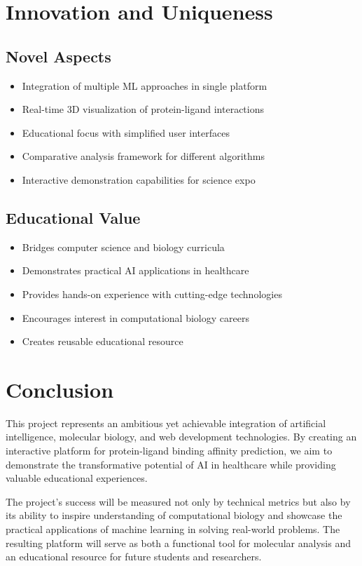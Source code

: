 \documentclass[12pt,a4paper]{article}
\begin{document}
\section{Innovation and Uniqueness}

\subsection{Novel Aspects}
\begin{itemize}
    \item Integration of multiple ML approaches in single platform
    \item Real-time 3D visualization of protein-ligand interactions
    \item Educational focus with simplified user interfaces
    \item Comparative analysis framework for different algorithms
    \item Interactive demonstration capabilities for science expo
\end{itemize}

\subsection{Educational Value}
\begin{itemize}
    \item Bridges computer science and biology curricula
    \item Demonstrates practical AI applications in healthcare
    \item Provides hands-on experience with cutting-edge technologies
    \item Encourages interest in computational biology careers
    \item Creates reusable educational resource
\end{itemize}

\section{Conclusion}

This project represents an ambitious yet achievable integration of artificial intelligence, molecular biology, and web development technologies. By creating an interactive platform for protein-ligand binding affinity prediction, we aim to demonstrate the transformative potential of AI in healthcare while providing valuable educational experiences.

The project's success will be measured not only by technical metrics but also by its ability to inspire understanding of computational biology and showcase the practical applications of machine learning in solving real-world problems. The resulting platform will serve as both a functional tool for molecular analysis and an educational resource for future students and researchers.
\end{document}
